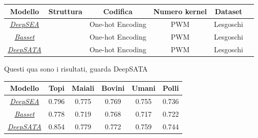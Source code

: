 \begin{table}[!h]
    \centering
    \renewcommand{\arraystretch}{2}
    \begin{tabular}{|c|c|c|c|c|c|} %
        \hline %
        \textbf{Modello} & \textbf{Struttura} & \textbf{Codifica} & \textbf{Numero kernel} & \textbf{Dataset} \\ 
        \hline\hline %
        \hyperref[sec:DeepSEA]{\textsl{DeepSEA}} & & One-hot Encoding & \acs{PWM} & Lesgoschi \\ 
        \hyperref[sec:Basset]{\textsl{Basset}} & & One-hot Encoding & \acs{PWM} & Lesgoschi \\ 
        \hyperref[sec:DeepSATA]{\textsl{DeepSATA}} & & One-hot Encoding & \acs{PWM} & Lesgoschi \\ 
        \hline
    \end{tabular}
    \renewcommand{\arraystretch}{1}
\end{table}



Questi qua sono i risultati, guarda DeepSATA

\begin{table}[!h]
    \centering
    \renewcommand{\arraystretch}{2}
    \begin{tabular}{|c|c|c|c|c|c|} %
        \hline %
        \textbf{Modello} & \textbf{Topi} & \textbf{Maiali} & \textbf{Bovini} & \textbf{Umani} & \textbf{Polli}\\ 
        \hline\hline %
        \hyperref[sec:DeepSEA]{\textsl{DeepSEA}} & 0.796 & 0.775 & 0.769 & 0.755 & 0.736 \\ 
        \hyperref[sec:Basset]{\textsl{Basset}} & 0.778 & 0.719 & 0.768 & 0.717 & 0.722 \\ 
        \hyperref[sec:DeepSATA]{\textsl{DeepSATA}} & 0.854 & 0.779 & 0.772 & 0.759 & 0.744 \\ 
        \hline
    \end{tabular}
    \renewcommand{\arraystretch}{1}
\end{table}



